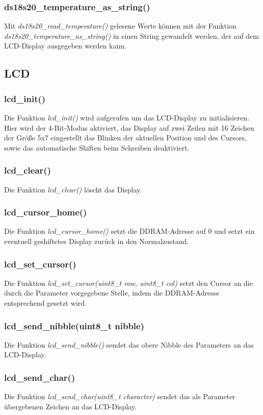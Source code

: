 \documentclass[10pt]{scrartcl}
\begin{document}
\subsubsection{ds18s20\_temperature\_as\_string()}
Mit \textit{ds18s20\_read\_temperature()} gelesene Werte können mit der Funktion\\ \textit{ds18s20\_temperature\_as\_string()} in einen String gewandelt werden, der auf dem LCD-Display ausgegeben werden kann.
\subsection{LCD}
\subsubsection{lcd\_init()}
Die Funktion \textit{lcd\_init()} wird aufgerufen um das LCD-Display zu initialisieren. Hier wird der 4-Bit-Modus aktiviert, das Display auf zwei Zeilen mit 16 Zeichen der Größe 5x7 eingestellt das Blinken der aktuellen Position und des Cursors, sowie das automatische Shiften beim Schreiben deaktiviert.
\subsubsection{lcd\_clear()}
Die Funktion \textit{lcd\_clear()} löscht das Display.
\subsubsection{lcd\_cursor\_home()}
Die Funktion \textit{lcd\_cursor\_home()} setzt die DDRAM-Adresse auf 0 und setzt ein eventuell geshiftetes Display zurück in den Normalzustand.
\subsubsection{lcd\_set\_cursor()}
Die Funktion \textit{lcd\_set\_cursor(uint8\_t row, uint8\_t col)} setzt den Cursor an die durch die Parameter vorgegebene Stelle, indem die DDRAM-Adresse entsprechend gesetzt wird.
\subsubsection{lcd\_send\_nibble(uint8\_t nibble)}
Die Funktion \textit{lcd\_send\_nibble()} sendet das obere Nibble des Parameters an das LCD-Display.
\subsubsection{lcd\_send\_char()}
Die Funktion \textit{lcd\_send\_char(uint8\_t character)} sendet das als Parameter übergebenen Zeichen an das LCD-Display.
\end{document}
